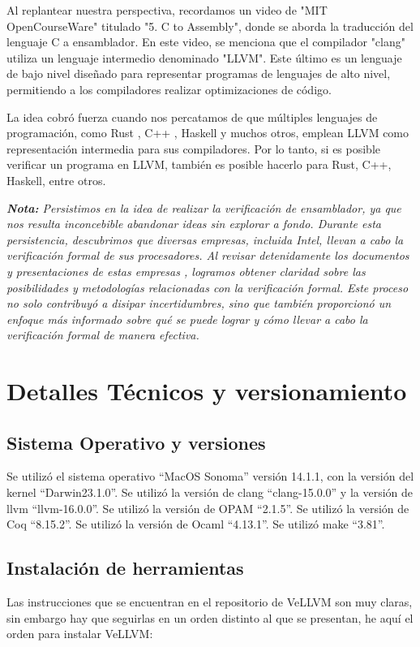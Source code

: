 \documentclass{hw-template}
\begin{document}
Al replantear nuestra perspectiva, recordamos un video de "MIT OpenCourseWare"
titulado "5. C to Assembly", donde se aborda la traducción del lenguaje C a
ensamblador. En este video, se menciona que el compilador "clang" utiliza
un lenguaje intermedio denominado "LLVM". Este último es un lenguaje de bajo
nivel diseñado para representar programas de lenguajes de alto nivel,
permitiendo a los compiladores realizar optimizaciones de código.

La idea cobró fuerza cuando nos percatamos de que múltiples lenguajes de
programación, como Rust \cite{rust}, C++ \cite{cpp}, Haskell \cite{haskell}
y muchos otros, emplean LLVM como representación intermedia para sus
compiladores. Por lo tanto, si es posible verificar un programa en LLVM,
también es posible hacerlo para Rust, C++, Haskell, entre otros.

\textit{\textbf{Nota:} Persistimos en la idea de realizar la verificación
de ensamblador, ya que nos resulta inconcebible abandonar ideas sin explorar
a fondo. Durante esta persistencia, descubrimos que diversas empresas,
incluida Intel, llevan a cabo la verificación formal de sus procesadores.
Al revisar detenidamente los documentos y presentaciones de estas empresas
\cite{intel-verification}, logramos obtener claridad sobre las posibilidades
y metodologías relacionadas con la verificación formal. Este proceso no
solo contribuyó a disipar incertidumbres, sino que también proporcionó un
enfoque más informado sobre qué se puede lograr y cómo llevar a cabo la
verificación formal de manera efectiva.} 

\section{Detalles Técnicos y versionamiento}

\subsection{Sistema Operativo y versiones}
Se utilizó el sistema operativo ``MacOS Sonoma'' versión 14.1.1, con la
versión del kernel ``Darwin23.1.0''. Se utilizó la versión de clang 
``clang-15.0.0'' y la versión de llvm ``llvm-16.0.0''. Se utilizó la
versión de OPAM ``2.1.5''. Se utilizó la versión de Coq ``8.15.2''. Se
utilizó la versión de Ocaml ``4.13.1''.  Se utilizó make ``3.81''.

\subsection{Instalación de herramientas}
Las instrucciones que se encuentran en el repositorio de VeLLVM \cite{vellvm}
son muy claras, sin embargo hay que seguirlas en un orden distinto al que se
presentan, he aquí el orden para instalar VeLLVM:
\end{document}

